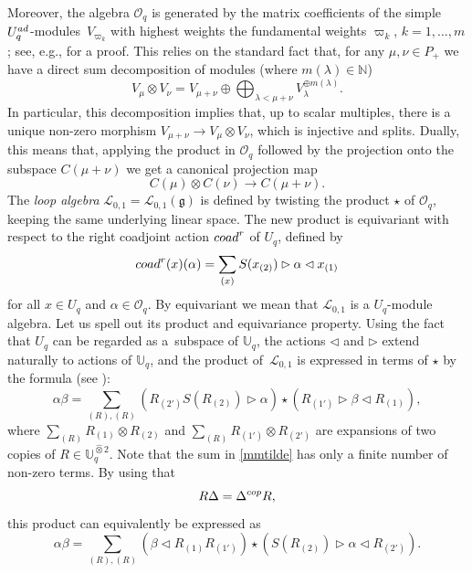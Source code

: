 \documentclass[11pt]{article}
\numberwithin{equation}{section}
\numberwithin{equation}{section}
\theoremstyle{definition}
\newcommand{\Oq}{\Oo_{q}}
\newcommand{\mUq}{\mathbb{U}_q}
\newcommand{\mn}{\mathbb{N}}
\newcommand{\Ll}{{\mathcal L}}
\newcommand{\Oo}{{\mathcal O}}
\newcommand{\ra}{\rightarrow}
\begin{document}
Moreover, the algebra $\Oo_q$ is generated by the matrix coefficients of the simple $U_q^{\rm ad}$-modules~$V_{\!\varpi_{\!k}}$ with highest weights the fundamental weights $\varpi_k$, $k=1,\dots,m$; see, e.g., \cite[Proposition~I.7.8]{BG} for a proof. This relies on the standard fact that, for any $\mu,\nu \in P_+$ we have a direct sum decomposition of modules (where $m(\lambda)\in \mn$)
\begin{equation}\label{decomprep}
V_\mu\otimes V_\nu = V_{\mu+\nu} \oplus \bigoplus_{\lambda < \mu+\nu} V_\lambda^{\oplus m(\lambda)}.
\end{equation}
In particular, this decomposition implies that, up to scalar multiples, there is a unique non-zero morphism $V_{\mu+\nu} \ra V_\mu\otimes V_\nu$, which is injective and splits. Dually, this means that, applying the product in $\Oo_q$ followed by the projection onto the subspace $C(\mu+\nu)$ we get a canonical projection map
\begin{equation}\label{projOq}
C(\mu)\otimes C(\nu) \ra C(\mu+\nu).
\end{equation}
The {\it loop algebra} $\Ll_{0,1} = \Ll_{0,1}(\mathfrak{g})$ is defined by twisting the product $\star$ of $\Oo_q$, keeping the same underlying linear space. The new product is equivariant with respect to the right coadjoint action ${\rm coad}^r$ of $U_q$, defined by
\[{\rm coad}^r(x)(\alpha) = \sum_{(x)}{S}(x_{(2)}) \rhd \alpha \lhd x_{(1)}\]
for all $x\in U_q$ and $\alpha\in \Oq$. By equivariant we mean that $\Ll_{0,1}$ is a $U_q$-module algebra. Let us spell out its product and equivariance property. Using the fact that $U_q$ can be regarded as a~subspace of $\mUq$, the actions $\lhd$ and $\rhd$ extend naturally to actions of $\mUq$, and the product of~$\Ll_{0,1}$ is expressed in terms of $\star$ by the formula (see \cite[Proposition 4.1]{BR}):
\begin{equation}\label{mmtilde}
\alpha\beta = \sum_{(R),(R)}(R_{(2')}{S}(R_{(2)}) \rhd \alpha) \star (R_{(1')}\rhd \beta \lhd R_{(1)}),
\end{equation}
where $ \sum_{(R)}R_{(1) }\otimes R_{(2)}$ and $\sum_{(R)}R_{(1') }\otimes R_{(2')}$ are expansions of two copies of $R\in \mUq^{\hat \otimes 2}$. Note that the sum in \eqref{mmtilde} has only a finite number of non-zero terms. By using that
\[R\Delta = \Delta^{\rm cop}R,\]
 this product can equivalently be expressed as
\begin{equation}\label{mmtildebis}
\alpha\beta = \sum_{(R),(R)}(\beta \lhd R_{(1)}R_{(1')}) \star (S(R_{(2)})\rhd \alpha \lhd R_{(2')}).
\end{equation}
\end{document}
